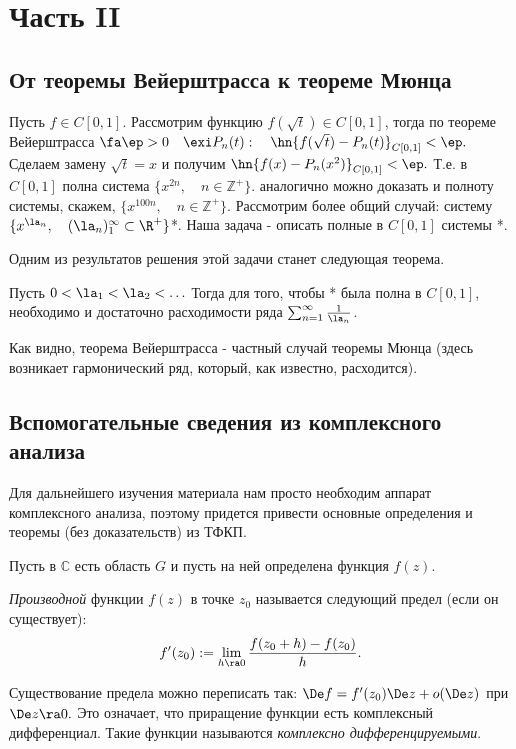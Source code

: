 \documentclass[a4paper]{article}
\begin{document}
\newpage
\section{Часть II}
\subsection{От теоремы Вейерштрасса к теореме Мюнца}
Пусть $f\in C[0,1]$. Рассмотрим функцию $f(\sqrt{t})\in C[0,1]$, тогда по теореме Вейерштрасса
$\fa\ep>0\quad\exi P_n(t):\quad\hn{f(\sqrt{t})-P_n(t)}_{C[0,1]}<\ep.$ Сделаем замену
$\sqrt{t}=x$ и получим $\hn{f(x)-P_n(x^2)}_{C[0,1]}<\ep.$ Т.е. в $C[0,1]$ полна система
$\{x^{2n},\quad n\in\mathbb{Z}^{+}\}$. аналогично можно доказать и полноту системы, скажем, $\{x^{100n},\quad
n\in\mathbb{Z}^{+}\}$. Рассмотрим более общий случай: систему
$\{x^{\la_n},\quad(\la_n)_1^{\infty}\subset\R ^{+}\}$*. Наша задача - описать полные в
$C[0,1]$ системы *.

Одним из результатов решения этой задачи станет следующая теорема.
\begin{theorem}[Мюнц 1914г.]
Пусть $0<\la_1<\la_2<\ldots$ Тогда для того, чтобы * была
полна в $C[0,1]$, необходимо и достаточно расходимости ряда
$\sum_{n=1}^{\infty}\frac1{\la_n}$.
\end{theorem}
Как видно, теорема Вейерштрасса - частный случай теоремы Мюнца
(здесь возникает гармонический ряд, который, как известно,
расходится).

\subsection{Вспомогательные сведения из комплексного анализа}
Для дальнейшего изучения материала нам просто необходим аппарат комплексного анализа, поэтому придется
привести основные определения и теоремы (без доказательств) из ТФКП.

Пусть в $\mathbb{C}$ есть область $G$ и пусть на ней определена
функция $f(z)$.

\begin{df}
  \emph{Производной} функции $f(z)$ в точке
  $z_0$ называется следующий предел (если он существует):
  $$f'(z_0):=\lim_{h\ra0}\frac{f(z_0+h)-f(z_0)}{h}.$$
\end{df}

Существование предела можно переписать так: $\De
f=f'(z_0)\De z+o(\De z)$ при $\De z\ra0.$ Это
означает, что приращение функции есть комплексный дифференциал.
Такие функции называются \emph{комплексно дифференцируемыми}.
\end{document}

